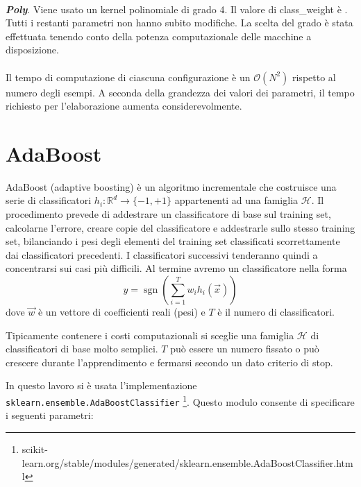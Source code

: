\documentclass[12pt,a4paper,oneside,hidelinks]{report}
\DeclareMathOperator*{\sgn}{sgn}
\begin{document}
\paragraph*{}
\textbf{\textit{Poly}}. Viene usato un kernel polinomiale di grado 4. Il valore di class\_weight è . Tutti i restanti parametri non hanno subito modifiche. La scelta del grado è stata effettuata tenendo conto della potenza computazionale delle macchine a disposizione.

\paragraph*{}
Il tempo di computazione di ciascuna configurazione è un $\mathcal{O}(N^2)$ rispetto al numero degli esempi. A seconda della grandezza dei valori dei parametri, il tempo richiesto per l'elaborazione aumenta considerevolmente. 

\section{AdaBoost}
AdaBoost (adaptive boosting) è un algoritmo incrementale che costruisce una serie di classificatori $ h_{i}:\mathbb{R}^{d}\rightarrow \{-1,+1\} $ appartenenti ad una famiglia $ \mathcal{H} $. 
Il procedimento prevede di addestrare un classificatore di base sul training set, calcolarne l'errore, creare copie del classificatore e addestrarle sullo stesso training set, bilanciando i pesi degli elementi del training set classificati scorrettamente dai classificatori precedenti. I classificatori successivi tenderanno quindi a concentrarsi sui casi più difficili.
Al termine avremo un classificatore nella forma
\[\hat{y}=\sgn(\sum_{i=1}^{T} w_{i}h_{i}(\vec{x}))\]
dove $ \vec{w} $ è un vettore di coefficienti reali (pesi) e $ T $ è il numero di classificatori.

Tipicamente contenere i costi computazionali si sceglie una famiglia $ \mathcal{H} $ di classificatori di base molto semplici. $ T $ può essere un numero fissato o può crescere durante l'apprendimento e fermarsi secondo un dato criterio di stop.

In questo lavoro si è usata l'implementazione \texttt{sklearn.ensemble.AdaBoostClassifier}
\footnote{scikit-learn.org/stable/modules/generated/sklearn.ensemble.AdaBoostClassifier.html}.
Questo modulo consente di specificare i seguenti parametri:
\end{document}
